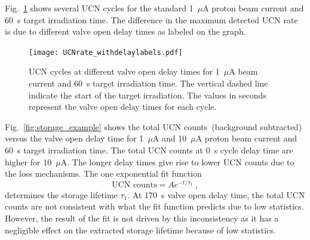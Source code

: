 Fig.~\ref{fig:storage_all} shows several UCN cycles for the standard
1~$\mu$A proton beam current and 60~s target irradiation time. The
difference in the maximum detected UCN rate is due to different valve
open delay times as labeled on the graph.
\begin{figure}[h!]
  \centering
  \texttt{[image: UCNrate\_withdelaylabels.pdf]}
  \caption[UCN rate at different value open delay times at 1~$\mu$A
  beam current and 60~s irradiation time ]{UCN cycles at different
    valve open delay times for 1~$\mu$A beam current and 60~s target
    irradiation time. The vertical dashed line indicate the start of
    the target irradiation. The values in seconds represent the valve
    open delay times for each cycle.}
  \label{fig:storage_all}
\end{figure}
Fig.~\ref{fig:storage_example} shows the total UCN counts~(background
subtracted) versus the valve open delay time for 1~$\mu$A and
10~$\mu$A proton beam current and 60~s target irradiation time. The
total UCN counts at 0~s cycle delay time are higher for 10~$\mu$A. The
longer delay times give rise to lower UCN counts due to the loss
mechanisms. The one exponential fit function
\begin{equation}
\text{UCN counts} = A e^{-t/\tau_1}~,
\end{equation}
determines the storage lifetime $\tau_1$. At 170~s valve open delay
time, the total UCN counts are not consistent with what the fit
function predicts due to low statistics. However, the result of the
fit is not driven by this inconsistency as it has a negligible effect
on the extracted storage lifetime because of low statistics.

